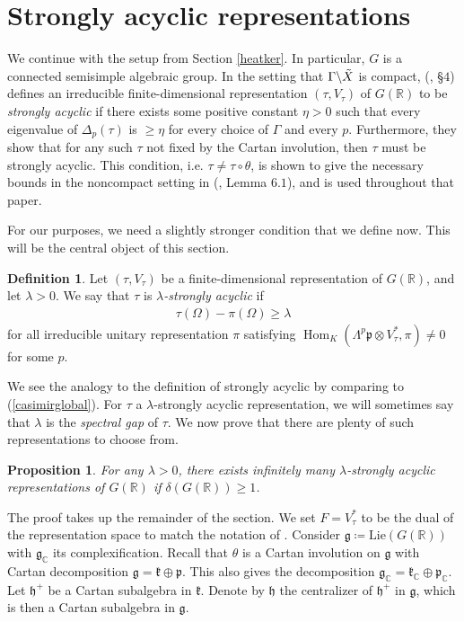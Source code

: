 \documentclass[11pt,reqno]{amsart}
\numberwithin{equation}{section}
\newtheorem{prop}[thm]{Proposition}
\theoremstyle{definition}
\newtheorem{defn}[thm]{Definition}
\theoremstyle{remark}
\newcommand{\Hom}{\operatorname{Hom}}
\newcommand{\mf}[1]{\mathfrak{#1}}
\newcommand{\C}{\mathbb{C}}
\newcommand{\R}{\mathbb{R}}
\begin{document}
\bigskip

\section{Strongly acyclic representations}\label{representations}
\noindent We continue with the setup from Section \ref{heatker}. In particular, $G$ is a connected semisimple algebraic group. In the setting that $\Gamma\backslash\Tilde{X}$ is compact, (\cite{BV}, §$4$) defines an irreducible finite-dimensional representation $(\tau,V_\tau)$ of $G(\R)$ to be \textit{strongly acyclic} if there exists some positive constant $\eta>0$ such that every eigenvalue of $\Delta_p(\tau)$ is $\geq \eta$ for every choice of $\Gamma$ and every $p$. Furthermore, they show that for any such $\tau$ not fixed by the Cartan involution, then $\tau$ must be strongly acyclic. This condition, i.e. $\tau\neq \tau\circ\theta$, is shown to give the necessary bounds in the noncompact setting in (\cite{MzM2}, Lemma $6.1$), and is used throughout that paper. 

For our purposes, we need a slightly stronger condition that we define now. This will be the central object of this section.
\begin{defn}
    Let $(\tau,V_\tau)$ be a finite-dimensional representation of $G(\R)$, and let $\lambda>0$. We say that $\tau$ is $\lambda$\textit{-strongly acyclic} if
    \begin{align*}
        \tau(\Omega)-\pi(\Omega) \geq \lambda
    \end{align*}
    for all irreducible unitary representation $\pi$ satisfying $\Hom_K(\Lambda^p\mf{p}\otimes V_\tau^*,\pi)\neq 0$ for some $p$.
\end{defn}
\noindent We see the analogy to the definition of strongly acyclic by comparing to (\ref{casimirglobal}). For $\tau$ a $\lambda$-strongly acyclic representation, we will sometimes say that $\lambda$ is the \textit{spectral gap} of $\tau$. We now prove that there are plenty of such representations to choose from.

\begin{prop}\label{kstrong}
    For any $\lambda>0$, there exists infinitely many $\lambda$-strongly acyclic representations of $G(\R)$ if $\delta(G(\R))\geq 1$.
\end{prop}

\noindent The proof takes up the remainder of the section. We set $F=V_\tau^*$ to be the dual of the representation space to match the notation of \cite{BV}. Consider $\mathfrak{g}\coloneqq \text{Lie}(G(\R))$ with $\mf{g}_\C$ its complexification. Recall that $\theta$ is a Cartan involution on $\mf{g}$ with Cartan decomposition $\mf{g}=\mf{k}\oplus\mf{p}$. This also gives the decomposition $\mf{g}_\C=\mf{k}_\C\oplus\mf{p}_\C$. Let $\mf{h}^+$ be a Cartan subalgebra in $\mf{k}$. Denote by $\mf{h}$ the centralizer of $\mf{h}^+$ in $\mf{g}$, which is then a Cartan subalgebra in $\mf{g}$.
\end{document}
